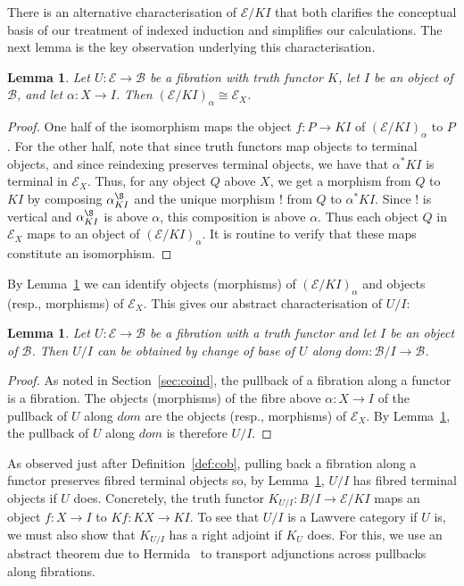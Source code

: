 \documentclass{LMCS}
\newcommand{\ra}{\rightarrow}
\newcommand\E{{\mathcal E}}
\newcommand\B{{\mathcal B}}
\theoremstyle{plain}
\newtheorem{lemma}[theorem]{Lemma}
\theoremstyle{remark}
\theoremstyle{definition}
\begin{document}
There is an alternative characterisation of $\E/KI$ that both
clarifies the conceptual basis of our treatment of indexed induction
and simplifies our calculations. The next lemma is the key observation
underlying this characterisation.
\begin{lemma}\label{lem:simindex}
  Let $U : \E \to \B$ be a fibration with truth functor $K$, let $I$
  be an object of $\B$, and let $\alpha:X \ra I$. Then
  $(\E/KI)_{\alpha} \cong \E_X$.
\end{lemma}
\begin{proof}
  One half of the isomorphism maps the object $f:P \ra KI$ of
  $(\E/KI)_{\alpha}$ to $P$. For the other half, note that since truth
  functors map objects to terminal objects, and since reindexing
  preserves terminal objects, we have that $\alpha^* KI$ is terminal
  in $\E_X$. Thus, for any object $Q$ above $X$, we get a morphism
  from $Q$ to $KI$ by composing $\alpha^\S_{KI}$ and the unique
  morphism $!$ from $Q$ to $\alpha^* KI$. Since $!$ is vertical and
  $\alpha^\S_{KI}$ is above $\alpha$, this composition is above
  $\alpha$. Thus each object $Q$ in $\E_X$ maps to an object of
  $(\E/KI)_{\alpha}$. It is routine to verify that these maps
  constitute an isomorphism.
\end{proof}
By Lemma~\ref{lem:simindex} we can identify objects (morphisms) of
$(\E/KI)_{\alpha}$ and objects (resp., morphisms) of $\E_X$.  This
gives our abstract characterisation of $U/I$:
\begin{lemma}\label{lem:U/Icob}
  Let $U : \E \to \B$ be a fibration with a truth functor and let $I$
  be an object of $\B$.  Then $U/I$ can be obtained by change of base
  of $U$ along $\mathit{dom}:\B/I \ra \B$.
\end{lemma}
\begin{proof}
  As noted in Section~\ref{sec:coind}, the pullback of a fibration
  along a functor is a fibration. The objects (morphisms) of the fibre
  above $\alpha:X \ra I$ of the pullback of $U$ along $\mathit{dom}$
  are the objects (resp., morphisms) of $\E_X$. By
  Lemma~\ref{lem:simindex}, the pullback of $U$ along $\mathit{dom}$
  is therefore $U/I$.
\end{proof}

As observed just after Definition~\ref{def:cob}, pulling back a
fibration along a functor preserves fibred terminal objects so, by
Lemma~\ref{lem:U/Icob}, $U/I$ has fibred terminal objects if $U$
does. Concretely, the truth functor $K_{U/I}:B/I \ra \E/KI$ maps an
object $f:X \ra I$ to $Kf:KX \ra KI$. To see that $U/I$ is a Lawvere
category if $U$ is, we must also show that $K_{U/I}$ has a right
adjoint if $K_U$ does. For this, we use an abstract theorem due to
Hermida~\cite{her93} to transport adjunctions across pullbacks along
fibrations.
\end{document}
